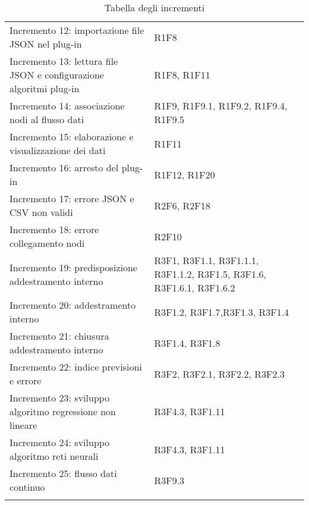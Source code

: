 \begin{longtable} {
		>{\raggedright\arraybackslash}p{85mm}
		>{\raggedleft\arraybackslash}p{40mm}
	}
	Incremento 12: importazione file JSON nel plug-in &
	R1F8 \TBstrut \\ [2mm]
	
	Incremento 13: lettura file JSON e configurazione algoritmi plug-in &
	R1F8, R1F11 \TBstrut \\ [2mm]
	
	Incremento 14: associazione nodi al flusso dati &
	R1F9, R1F9.1, R1F9.2, R1F9.4, R1F9.5 \TBstrut \\ [2mm]
	
	Incremento 15: elaborazione e visualizzazione dei dati &
	R1F11 \TBstrut \\ [2mm]
	
	Incremento 16: arresto del plug-in &
	R1F12, R1F20 \TBstrut \\ [2mm]
	
	Incremento 17: errore JSON e CSV non validi &
	R2F6, R2F18 \TBstrut \\ [2mm]
	
	Incremento 18: errore collegamento nodi &
	R2F10 \TBstrut \\ [2mm]
	
	Incremento 19: predisposizione addestramento interno &
	R3F1, R3F1.1, R3F1.1.1, R3F1.1.2, R3F1.5, R3F1.6, R3F1.6.1, R3F1.6.2 \TBstrut \\ [2mm]
	
	Incremento 20: addestramento interno &
	R3F1.2, R3F1.7,R3F1.3, R3F1.4 \TBstrut \\ [2mm]
	
	Incremento 21: chiusura addestramento interno &
	R3F1.4, R3F1.8 \TBstrut \\ [2mm]
	
	Incremento 22: indice previsioni e errore &
	R3F2, R3F2.1, R3F2.2, R3F2.3 \TBstrut \\ [2mm]
	
	Incremento 23: sviluppo algoritmo regressione non lineare &
	R3F4.3, R3F1.11 \TBstrut \\ [2mm]
	
	Incremento 24: sviluppo algoritmo reti neurali\glo &
	R3F4.3, R3F1.11 \TBstrut \\ [2mm]
	
	Incremento 25: flusso dati continuo &
	R3F9.3 \TBstrut \\ [2mm]
	\rowcolor{white}
	\caption{Tabella degli incrementi}
\end{longtable}

